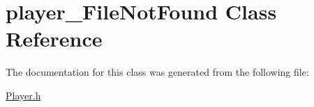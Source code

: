 \hypertarget{classplayer___file_not_found}{}\section{player\+\_\+\+File\+Not\+Found Class Reference}
\label{classplayer___file_not_found}


The documentation for this class was generated from the following file\+:\begin{DoxyCompactItemize}
\item 
\hyperlink{_player_8h}{Player.\+h}\end{DoxyCompactItemize}
